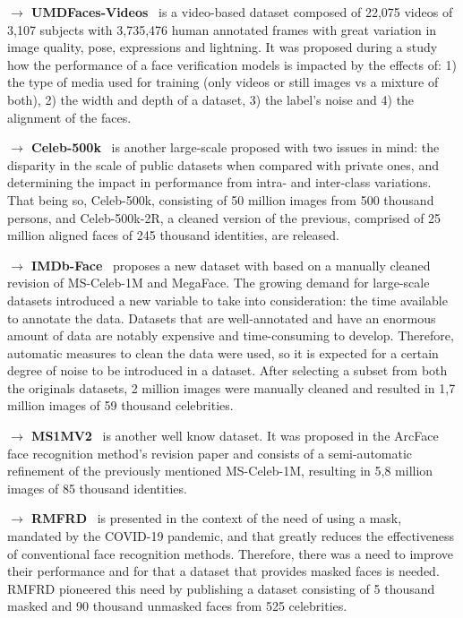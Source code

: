 \documentclass[class=report, crop=false, a4paper, 12pt]{standalone}
\begin{document}
\begin{appendix}
\vspace{0.7\baselineskip}
\noindent\textbf{$\rightarrow$ UMDFaces-Videos}~\autocite{bansalDonTsCNNbased2017} is a video-based dataset composed of 22,075 videos of 3,107 subjects with 3,735,476 human annotated frames with great variation in image quality, pose, expressions and lightning. It was proposed during a study how the performance of a face verification models is impacted by the effects of: 1) the type of media used for training (only videos or still images vs a mixture of both), 2) the width and depth of a dataset, 3) the label's noise and 4) the alignment of the faces.

\vspace{0.7\baselineskip}
\noindent\textbf{$\rightarrow$ Celeb-500k}~\autocite{caoCeleb500KLargeTraining2018} is another large-scale proposed with two issues in mind: the disparity in the scale of public datasets when compared with private ones, and determining the impact in performance from intra- and inter-class variations. That being so, Celeb-500k, consisting of 50 million images from 500 thousand persons, and Celeb-500k-2R, a cleaned version of the previous, comprised of 25 million aligned faces of 245 thousand identities, are released.

\vspace{0.7\baselineskip}
\noindent\textbf{$\rightarrow$ IMDb-Face}~\autocite{wangDevilFaceRecognition2018} proposes a new dataset with based on a manually cleaned revision of MS-Celeb-1M and MegaFace. The growing demand for large-scale datasets introduced a new variable to take into consideration: the time available to annotate the data. Datasets that are well-annotated and have an enormous amount of data are notably expensive and time-consuming to develop. Therefore, automatic measures to clean the data were used, so it is expected for a certain degree of noise to be introduced in a dataset. After selecting a subset from both the originals datasets, 2 million images were manually cleaned and resulted in 1,7 million images of 59 thousand celebrities.

\vspace{0.7\baselineskip}
\noindent\textbf{$\rightarrow$ MS1MV2}~\autocite{dengArcFaceAdditiveAngular} is another well know dataset. It was proposed in the ArcFace face recognition method's revision paper and consists of a semi-automatic refinement of the previously mentioned MS-Celeb-1M, resulting in 5,8 million images of 85 thousand identities.

\vspace{0.7\baselineskip}
\noindent\textbf{$\rightarrow$ RMFRD}~\autocite{wangMaskedFaceRecognition2020} is presented in the context of the need of using a mask, mandated by the COVID-19 pandemic, and that greatly reduces the effectiveness of conventional face recognition methods. Therefore, there was a need to improve their performance and for that a dataset that provides masked faces is needed. RMFRD pioneered this need by publishing a dataset consisting of 5 thousand masked and 90 thousand unmasked faces from 525 celebrities.


\end{appendix}
\end{document}
